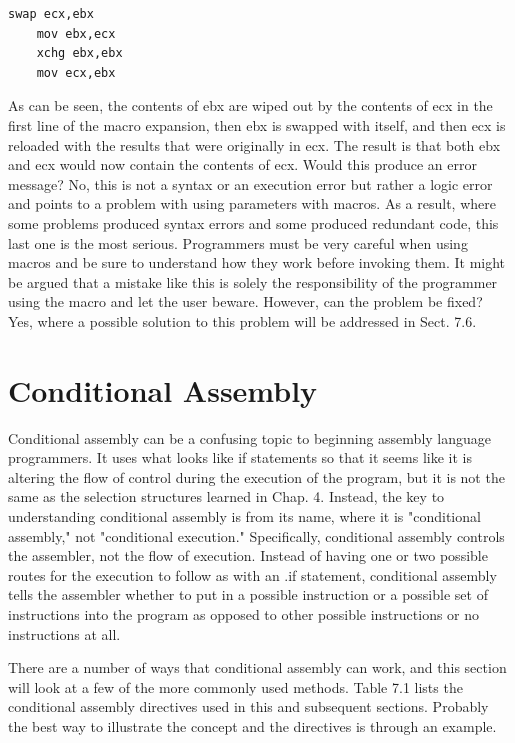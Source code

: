 \documentclass[10pt]{book}
\begin{document}
\begin{verbatim}
swap ecx,ebx
    mov ebx,ecx
    xchg ebx,ebx
    mov ecx,ebx
\end{verbatim}

As can be seen, the contents of ebx are wiped out by the contents of ecx in the first line of the macro expansion, then ebx is swapped with itself, and then ecx is reloaded with the results that were originally in ecx. The result is that both ebx and ecx would now contain the contents of ecx. Would this produce an error message? No, this is not a syntax or an execution error but rather a logic error and points to a problem with using parameters with macros. As a result, where some problems produced syntax errors and some produced redundant code, this last one is the most serious. Programmers must be very careful when using macros and be sure to understand how they work before invoking them. It might be argued that a mistake like this is solely the responsibility of the programmer using the macro and let the user beware. However, can the problem be fixed? Yes, where a possible solution to this problem will be addressed in Sect. 7.6.


\section{Conditional Assembly}
Conditional assembly can be a confusing topic to beginning assembly language programmers. It uses what looks like if statements so that it seems like it is altering the flow of control during the execution of the program, but it is not the same as the selection structures learned in Chap. 4. Instead, the key to understanding conditional assembly is from its name, where it is "conditional assembly," not "conditional execution." Specifically, conditional assembly controls the assembler, not the flow of execution. Instead of having one or two possible routes for the execution to follow as with an .if statement, conditional assembly tells the assembler whether to put in a possible instruction or a possible set of instructions into the program as opposed to other possible instructions or no instructions at all.

There are a number of ways that conditional assembly can work, and this section will look at a few of the more commonly used methods. Table 7.1 lists the conditional assembly directives used in this and subsequent sections. Probably the best way to illustrate the concept and the directives is through an example.
\end{document}
